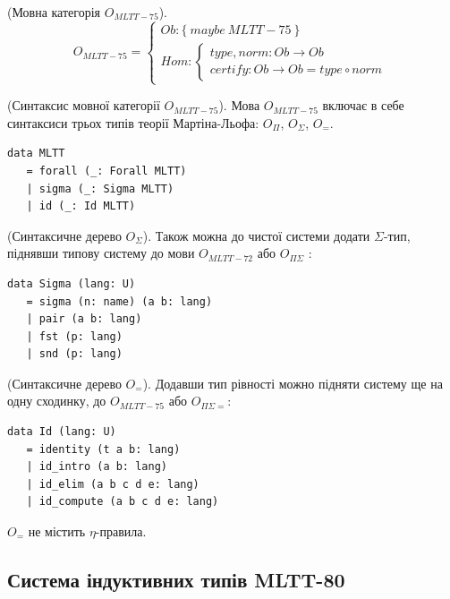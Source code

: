 \begin{definition} (Мовна категорія $O_{MLTT-75}$).
\begin{equation}
O_{MLTT-75} =
\begin{cases}
Ob: \{\ maybe\ MLTT-75\ \} \\
Hom: \begin{cases}
type,norm: Ob \rightarrow Ob \\
certify: Ob \rightarrow Ob = type \circ norm
\end{cases}
\end{cases}
\end{equation}
\end{definition}

\begin{definition} (Синтаксис мовної категорії $O_{MLTT-75}$).
Мова $O_{MLTT-75}$ включає в себе синтаксиси трьох типів
теорії Мартіна-Льофа: $O_\Pi$, $O_\Sigma$, $O_=$.
\begin{lstlisting}
data MLTT
   = forall (_: Forall MLTT)
   | sigma (_: Sigma MLTT)
   | id (_: Id MLTT)
\end{lstlisting}
\end{definition}

\begin{definition} (Синтаксичне дерево $O_\Sigma$).
Також можна до чистої системи додати $\Sigma$-тип,
піднявши типову систему до мови $O_{MLTT-72}$ або $O_{\Pi\Sigma}$ :
\begin{lstlisting}[mathescape=true]
data Sigma (lang: U)
   = sigma (n: name) (a b: lang)
   | pair (a b: lang)
   | fst (p: lang)
   | snd (p: lang)
\end{lstlisting}
\end{definition}

\begin{definition} (Синтаксичне дерево $O_=$).
Додавши тип рівності можно підняти систему ще на одну сходинку,
до $O_{MLTT-75}$ або $O_{\Pi\Sigma=}$:
\begin{lstlisting}[mathescape=true]
data Id (lang: U)
   = identity (t a b: lang)
   | id_intro (a b: lang)
   | id_elim (a b c d e: lang)
   | id_compute (a b c d e: lang)
\end{lstlisting}
\end{definition}

$O_=$ не містить $\eta$-правила.

\newpage
\subsection{Система індуктивних типів MLTT-80}

